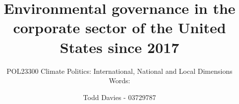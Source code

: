 \usepackage{microtype}
\usepackage{hyperref}

\usepackage{csquotes}

\usepackage{float}


\usepackage{setspace}

\usepackage{pgfplots}
\pgfplotsset{compat=newest}

\usepackage[round, sort]{natbib}
\usepackage{url}
\DeclareRobustCommand{\firstsecond}[2]{#1}
\usepackage{caption}

\author{Todd Davies - 03729787}

\newcommand{\Title}{Environmental governance in the corporate sector
of the United States since 2017}

\title{\Title}
\subtitle{POL23300 Climate Politics: International, National and Local Dimensions\\Words: }
